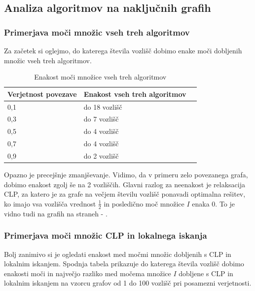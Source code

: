 \documentclass[a4paper, 12 pt]{article}
\theoremstyle{definition}
\theoremstyle{plain}
\theoremstyle{remark}
\begin{document}
\subsection{Analiza algoritmov na naključnih grafih}

\subsubsection{Primerjava moči množic vseh treh algoritmov}

Za začetek si oglejmo, do katerega števila vozlišč dobimo enake moči dobljenih množic vseh treh algoritmov.



\begin{table}[H]
\centering
\begin{tabular}{|p{2.1cm}|p{3.2cm}|p{6cm}|}
\hline
\textbf{Verjetnost povezave}  & \textbf{Enakost vseh treh algoritmov} \\ \hline
0,1    & do 18 vozlišč   \\ \hline
0,3    & do 7 vozlišč     \\ \hline
0,5    & do 4 vozlišč  \\ \hline
0,7    & do 4 vozlišč \\ \hline
0,9    & do 2 vozlišč    \\ \hline
\end{tabular}
\caption{Enakost moči množice vseh treh algoritmov}
\label{fig:enakost vseh treh} 
\end{table}

Opazno je precejšnje zmanjševanje. Vidimo, da v primeru zelo povezanega grafa, dobimo enakost zgolj še na 2 vozliščih. Glavni razlog za neenakost je relaksacija CLP, za katero je za grafe na večjem številu vozlišč ponavadi optimalna rešitev, ko imajo vsa vozlišča vrednost $\frac{1}{2}$ in posledično moč množice $I$ enaka 0. To je vidno tudi na grafih na straneh \pageref{fig:moc0,1} - \pageref{fig:moc0,9}.

\subsubsection{Primerjava moči množic CLP in lokalnega iskanja}

Bolj zanimivo si je ogledati enakost med močmi množic dobljenih s CLP in lokalnim iskanjem. Spodnja tabela prikazuje do katerega števila vozlišč dobimo enakosti moči in največjo razliko med močema množice $I$ dobljene s CLP in lokalnim iskanjem na vzorcu grafov od 1 do 100 vozlišč pri posamezni verjetnosti.
\end{document}
